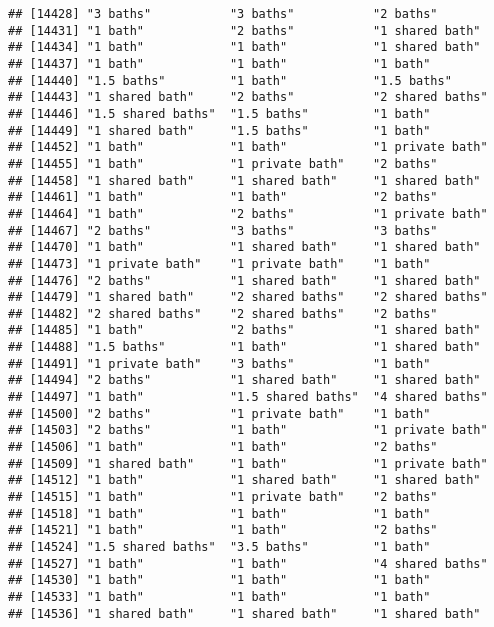 \documentclass[
]{article}
\begin{document}
\begin{verbatim}
## [14428] "3 baths"           "3 baths"           "2 baths"          
## [14431] "1 bath"            "2 baths"           "1 shared bath"    
## [14434] "1 bath"            "1 bath"            "1 shared bath"    
## [14437] "1 bath"            "1 bath"            "1 bath"           
## [14440] "1.5 baths"         "1 bath"            "1.5 baths"        
## [14443] "1 shared bath"     "2 baths"           "2 shared baths"   
## [14446] "1.5 shared baths"  "1.5 baths"         "1 bath"           
## [14449] "1 shared bath"     "1.5 baths"         "1 bath"           
## [14452] "1 bath"            "1 bath"            "1 private bath"   
## [14455] "1 bath"            "1 private bath"    "2 baths"          
## [14458] "1 shared bath"     "1 shared bath"     "1 shared bath"    
## [14461] "1 bath"            "1 bath"            "2 baths"          
## [14464] "1 bath"            "2 baths"           "1 private bath"   
## [14467] "2 baths"           "3 baths"           "3 baths"          
## [14470] "1 bath"            "1 shared bath"     "1 shared bath"    
## [14473] "1 private bath"    "1 private bath"    "1 bath"           
## [14476] "2 baths"           "1 shared bath"     "1 shared bath"    
## [14479] "1 shared bath"     "2 shared baths"    "2 shared baths"   
## [14482] "2 shared baths"    "2 shared baths"    "2 baths"          
## [14485] "1 bath"            "2 baths"           "1 shared bath"    
## [14488] "1.5 baths"         "1 bath"            "1 shared bath"    
## [14491] "1 private bath"    "3 baths"           "1 bath"           
## [14494] "2 baths"           "1 shared bath"     "1 shared bath"    
## [14497] "1 bath"            "1.5 shared baths"  "4 shared baths"   
## [14500] "2 baths"           "1 private bath"    "1 bath"           
## [14503] "2 baths"           "1 bath"            "1 private bath"   
## [14506] "1 bath"            "1 bath"            "2 baths"          
## [14509] "1 shared bath"     "1 bath"            "1 private bath"   
## [14512] "1 bath"            "1 shared bath"     "1 shared bath"    
## [14515] "1 bath"            "1 private bath"    "2 baths"          
## [14518] "1 bath"            "1 bath"            "1 bath"           
## [14521] "1 bath"            "1 bath"            "2 baths"          
## [14524] "1.5 shared baths"  "3.5 baths"         "1 bath"           
## [14527] "1 bath"            "1 bath"            "4 shared baths"   
## [14530] "1 bath"            "1 bath"            "1 bath"           
## [14533] "1 bath"            "1 bath"            "1 bath"           
## [14536] "1 shared bath"     "1 shared bath"     "1 shared bath"    

\end{verbatim}
\end{document}
